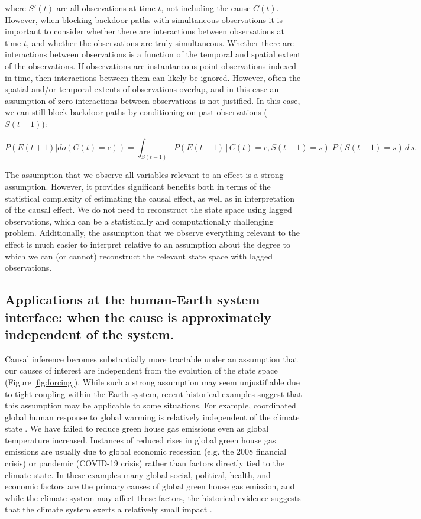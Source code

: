 \documentclass[12pt]{article}
\begin{document}
where $S'(t)$ are all observations at time $t$, not including the
cause $C(t)$. However, when blocking backdoor paths with simultaneous
observations it is important to consider whether there are
interactions between observations at time $t$, and whether the
observations are truly simultaneous. Whether there are interactions
between observations is a function of the temporal and spatial extent
of the observations. If observations are instantaneous point
observations indexed in time, then interactions between them can
likely be ignored. However, often the spatial and/or temporal extents
of observations overlap, and in this case an assumption of zero
interactions between observations is not justified. In this case, we
can still block backdoor paths by conditioning on past observations
($S(t-1)$):

\begin{equation}
  P(E(t+1)| do(C(t)=c)) = \int_{S(t-1)} P(E(t+1) \, | \, C(t)=c,
  S(t-1) = s
  )\; P(S(t-1)=s) \, d \, s.
\end{equation}

The assumption that we observe all variables relevant to an effect is
a strong assumption. However, it provides significant benefits both in
terms of the statistical complexity of estimating the causal effect,
as well as in interpretation of the causal effect. We do not need to
reconstruct the state space  using lagged observations, which can be a
statistically and computationally challenging problem. Additionally,
the assumption that we observe everything relevant to the effect is
much easier to interpret relative to an assumption about the degree to
which we can (or cannot) reconstruct the relevant state space with
lagged observations.

\subsection{Applications at the human-Earth system interface: when the
  cause is approximately independent of the system.}
\label{human}

Causal inference becomes substantially more tractable under an
assumption that our causes of interest are independent from the
evolution of the state space (Figure \ref{fig:forcing}). While such a
strong assumption may seem unjustifiable due to tight coupling within
the Earth system, recent historical examples suggest that this
assumption may be applicable to some situations. For example,
coordinated global human response to global warming is relatively
independent of the climate state \citep{arto2014drivers}. We have
failed to reduce green house gas emissions even as global temperature
increased. Instances of reduced rises in global green house gas
emissions are usually due to global economic recession (e.g. the 2008
financial crisis) or pandemic (COVID-19 crisis) rather than factors
directly tied to the climate state. In these examples many global
social, political, health, and economic factors are the primary causes
of global green house gas emission, and while the climate system may
affect these factors, the historical evidence suggests that the
climate system exerts a relatively small impact
\citep{arto2014drivers}.
\end{document}
